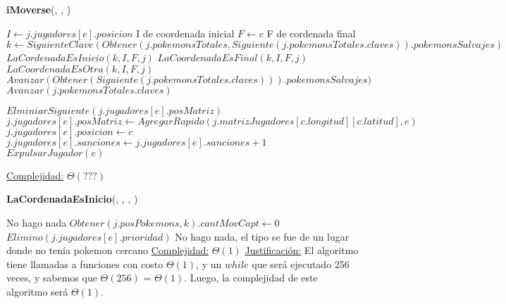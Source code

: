 
\begin{algorithm}[H]{\textbf{iMoverse}(, , )}
    \begin{algorithmic}[1]
        \State $I \gets j.jugadores[e].posicion$ \Comment I de coordenada inicial
        \State $F \gets c$  \Comment F de cordenada final
                   \State $k \gets SiguienteClave(Obtener(j.pokemonsTotales, Siguiente(j.pokemonsTotales.claves)).pokemonsSalvajes)$
                   \State $LaCordenadaEsInicio(k, I, F, j)$
                   \State $LaCoordenadaEsFinal(k, I, F, j)$
                   \State $LaCoordenadaEsOtra(k, I, F, j)$
                \State$Avanzar(Obtener(Siguiente(j.pokemonsTotales.claves))).pokemonsSalvajes)$
                \EndWhile
        \State $Avanzar(j.pokemonsTotales.claves)$
     \EndWhile
        
        \State $ElminiarSiguiente(j.jugadores[e].posMatriz)$
        \State $j.jugadores[e].posMatriz \gets AgregarRapido(j.matrizJugadores[c.longitud][c.latitud], e)$
        \State $j.jugadores[e].posicion \gets c$
            \State $j.jugadores[e].sanciones \gets j.jugadores[e].sanciones + 1$
        \EndIf
            \State $ExpulsarJugador(e)$
        \EndIf

        \Statex \underline{Complejidad:} $\Theta(???)$
    \end{algorithmic}
\end{algorithm}

\begin{algorithm}[H]{\textbf{LaCordenadaEsInicio}(, , , )}   
    \begin{algorithmic}[1]
                                \State \Comment No hago nada
                            \Else
                                \State $Obtener(j.posPokemons, k).cantMovCapt \gets 0$
                                \State $Elimino(j.jugadores[e].prioridad)$
                            \EndIf
                        \Else
\State \Comment No hago nada, el tipo se fue de un lugar donde no tenía pokemon cercano
                        \EndIf
                    \EndIf
                \EndIf
                \medskip
        \Statex \underline{Complejidad:} $\Theta(1)$
        \Statex \underline{Justificación:}  El algoritmo tiene llamadas a funciones con costo $\Theta(1)$, y un $while$ que será ejecutado 256 veces, y sabemos que $\Theta (256)$ = $\Theta (1)$. Luego, la complejidad de este algoritmo será $\Theta (1)$.
    \end{algorithmic}
\end{algorithm} 

